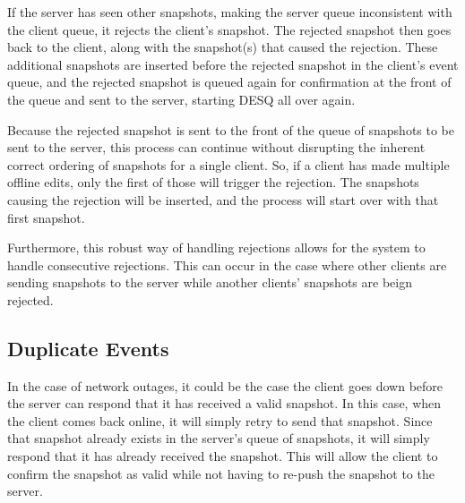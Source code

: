 If the server has seen other snapshots, making the server queue inconsistent with the client queue, it rejects the client's snapshot. The rejected snapshot then goes back to the client, along with the snapshot(s) that caused the rejection. These additional snapshots are inserted before the rejected snapshot in the client's event queue, and the rejected snapshot is queued again for confirmation at the front of the queue and sent to the server, starting DESQ all over again. 

Because the rejected snapshot is sent to the front of the queue of snapshots to be sent to the server, this process can continue without disrupting the inherent correct ordering of snapshots for a single client. So, if a client has made multiple offline edits, only the first of those will trigger the rejection. The snapshots causing the rejection will be inserted, and the process will start over with that first snapshot.

Furthermore, this robust way of handling rejections allows for the system to handle consecutive rejections. This can occur in the case where other clients are sending snapshots to the server while another clients' snapshots are beign rejected.

\subsection{Duplicate Events}

In the case of network outages, it could be the case the client goes down before the server can respond that it has received a valid snapshot. In this case, when the client comes back online, it will simply retry to send that snapshot. Since that snapshot already exists in the server’s queue of snapshots, it will simply respond that it has already received the snapshot. This will allow the client to confirm the snapshot as valid while not having to re-push the snapshot to the server.